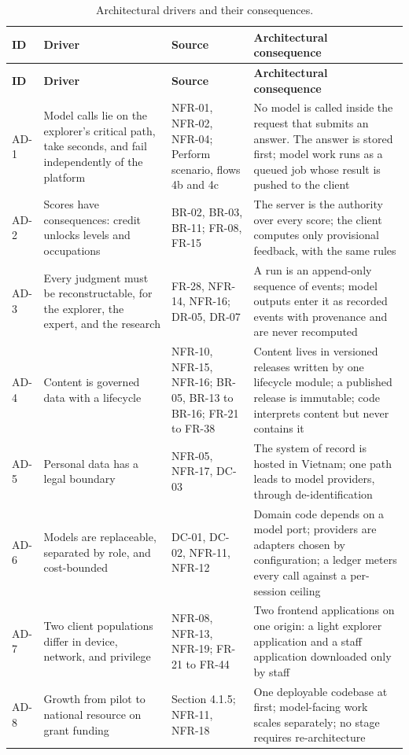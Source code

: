 {\small
\begin{longtable}{|>{\raggedright\arraybackslash}p{}|>{\raggedright\arraybackslash}p{}|>{\raggedright\arraybackslash}p{}|>{\raggedright\arraybackslash}p{}|}
\caption{Architectural drivers and their consequences.} \\
\hline
\textbf{ID} & \textbf{Driver} & \textbf{Source} & \textbf{Architectural consequence} \\ \hline
\endfirsthead
\hline
\textbf{ID} & \textbf{Driver} & \textbf{Source} & \textbf{Architectural consequence} \\ \hline
\endhead
AD-1 & Model calls lie on the explorer's critical path, take seconds, and fail independently of the platform & NFR-01, NFR-02, NFR-04; Perform scenario, flows 4b and 4c & No model is called inside the request that submits an answer. The answer is stored first; model work runs as a queued job whose result is pushed to the client \\ \hline
AD-2 & Scores have consequences: credit unlocks levels and occupations & BR-02, BR-03, BR-11; FR-08, FR-15 & The server is the authority over every score; the client computes only provisional feedback, with the same rules \\ \hline
AD-3 & Every judgment must be reconstructable, for the explorer, the expert, and the research & FR-28, NFR-14, NFR-16; DR-05, DR-07 & A run is an append-only sequence of events; model outputs enter it as recorded events with provenance and are never recomputed \\ \hline
AD-4 & Content is governed data with a lifecycle & NFR-10, NFR-15, NFR-16; BR-05, BR-13 to BR-16; FR-21 to FR-38 & Content lives in versioned releases written by one lifecycle module; a published release is immutable; code interprets content but never contains it \\ \hline
AD-5 & Personal data has a legal boundary & NFR-05, NFR-17, DC-03 & The system of record is hosted in Vietnam; one path leads to model providers, through de-identification \\ \hline
AD-6 & Models are replaceable, separated by role, and cost-bounded & DC-01, DC-02, NFR-11, NFR-12 & Domain code depends on a model port; providers are adapters chosen by configuration; a ledger meters every call against a per-session ceiling \\ \hline
AD-7 & Two client populations differ in device, network, and privilege & NFR-08, NFR-13, NFR-19; FR-21 to FR-44 & Two frontend applications on one origin: a light explorer application and a staff application downloaded only by staff \\ \hline
AD-8 & Growth from pilot to national resource on grant funding & Section 4.1.5; NFR-11, NFR-18 & One deployable codebase at first; model-facing work scales separately; no stage requires re-architecture \\ \hline
\end{longtable}
}

